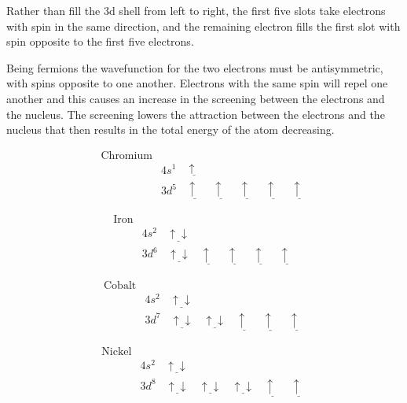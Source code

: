 Rather than fill the 3d shell from left to right, the first five slots take electrons with spin in the same direction, and the remaining electron fills the first slot with spin opposite to the first five electrons.

Being fermions the wavefunction for the two electrons must be antisymmetric, with spins opposite to one another.  Electrons with the same spin will repel one another and this causes an increase in the screening between the electrons and the nucleus.  The screening lowers the attraction between the electrons and the nucleus that then results in the total energy of the atom decreasing\cite{aligningelectrons}.

\begin{equation}
\begin{split}
\text{Chromium}\\
&4s^1 \:\:\:\:  \underline{\uparrow \:\:} \\
&3d^5 \:\:\:\:  \underline{\uparrow \:\:} \:\:\:\:  \underline{\uparrow \:\:} \:\:\:\:  \underline{\uparrow \:\:} \:\:\:\: \underline{\uparrow \:\:} \:\:\:\: \underline{\uparrow \:\:}
\end{split}
\label{eq:chromiumconfig}
\end{equation}

\begin{equation}
\begin{split}
\text{Iron}\\
&4s^2 \:\:\:\:  \underline{\uparrow \downarrow} \\
&3d^6 \:\:\:\:  \underline{\uparrow \downarrow} \:\:\:\:  \underline{\uparrow \:\:} \:\:\:\:  \underline{\uparrow \:\:} \:\:\:\: \underline{\uparrow \:\:} \:\:\:\: \underline{\uparrow \:\:}
\end{split}
\label{eq:ironconfig}
\end{equation}

\begin{equation}
\begin{split}
\text{Cobalt}\\
&4s^2 \:\:\:\:  \underline{\uparrow \downarrow} \\
&3d^7 \:\:\:\:  \underline{\uparrow \downarrow} \:\:\:\:  \underline{\uparrow  \downarrow} \:\:\:\:  \underline{\uparrow \:\:} \:\:\:\: \underline{\uparrow \:\:} \:\:\:\: \underline{\uparrow \:\:}
\end{split}
\label{eq:cobaltconfig}
\end{equation}

\begin{equation}
\begin{split}
\text{Nickel}\\
&4s^2 \:\:\:\:  \underline{\uparrow \downarrow} \\
&3d^8 \:\:\:\:  \underline{\uparrow \downarrow} \:\:\:\:  \underline{\uparrow  \downarrow} \:\:\:\:  \underline{\uparrow  \downarrow} \:\:\:\: \underline{\uparrow \:\:} \:\:\:\: \underline{\uparrow \:\:}
\end{split}
\label{eq:nickelconfig}
\end{equation}

